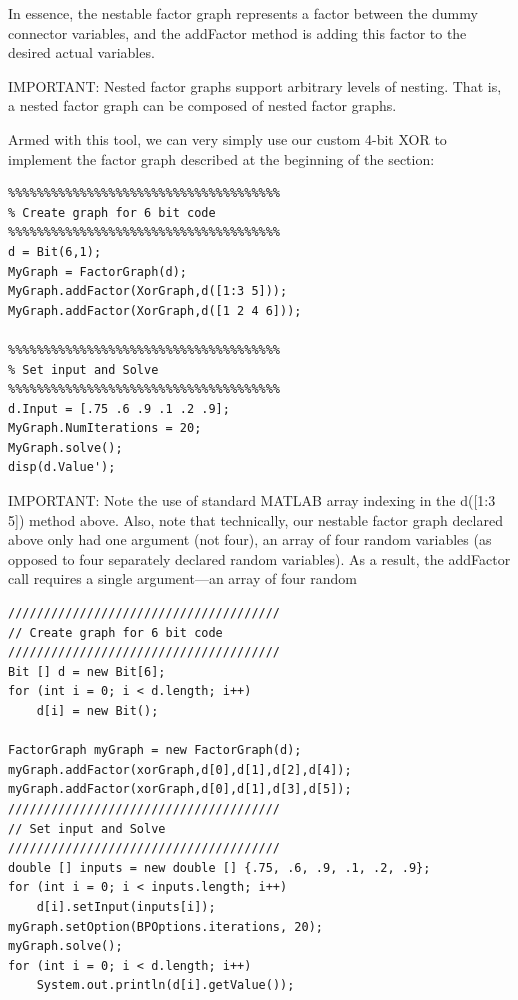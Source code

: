 In essence, the nestable factor graph represents a factor between the dummy connector variables, and the addFactor method is adding this factor to the desired actual variables.

IMPORTANT: Nested factor graphs support arbitrary levels of nesting.  That is, a nested factor graph can be composed of nested factor graphs.

Armed with this tool, we can very simply use our custom 4-bit XOR to implement the factor graph described at the beginning of the section:

\ifmatlab

\begin{lstlisting}
%%%%%%%%%%%%%%%%%%%%%%%%%%%%%%%%%%%%%% 
% Create graph for 6 bit code 
%%%%%%%%%%%%%%%%%%%%%%%%%%%%%%%%%%%%%% 
d = Bit(6,1);
MyGraph = FactorGraph(d); 
MyGraph.addFactor(XorGraph,d([1:3 5])); 
MyGraph.addFactor(XorGraph,d([1 2 4 6]));

%%%%%%%%%%%%%%%%%%%%%%%%%%%%%%%%%%%%%% 
% Set input and Solve 
%%%%%%%%%%%%%%%%%%%%%%%%%%%%%%%%%%%%%% 
d.Input = [.75 .6 .9 .1 .2 .9]; 
MyGraph.NumIterations = 20;
MyGraph.solve();
disp(d.Value');
\end{lstlisting}



IMPORTANT: Note the use of standard MATLAB array indexing in the d([1:3 5]) method above. Also, note that technically, our nestable factor graph declared above only had one argument (not four), an array of four random variables (as opposed to four separately declared random variables). As a result, the addFactor call requires a single argument---an array of four random 

\fi

\ifjava
\begin{lstlisting}
////////////////////////////////////// 
// Create graph for 6 bit code 
////////////////////////////////////// 
Bit [] d = new Bit[6];
for (int i = 0; i < d.length; i++)
	d[i] = new Bit();

FactorGraph myGraph = new FactorGraph(d); 
myGraph.addFactor(xorGraph,d[0],d[1],d[2],d[4]); 
myGraph.addFactor(xorGraph,d[0],d[1],d[3],d[5]);
////////////////////////////////////// 
// Set input and Solve 
////////////////////////////////////// 
double [] inputs = new double [] {.75, .6, .9, .1, .2, .9};
for (int i = 0; i < inputs.length; i++)
	d[i].setInput(inputs[i]);
myGraph.setOption(BPOptions.iterations, 20);
myGraph.solve();
for (int i = 0; i < d.length; i++)
	System.out.println(d[i].getValue());
\end{lstlisting}
\fi

